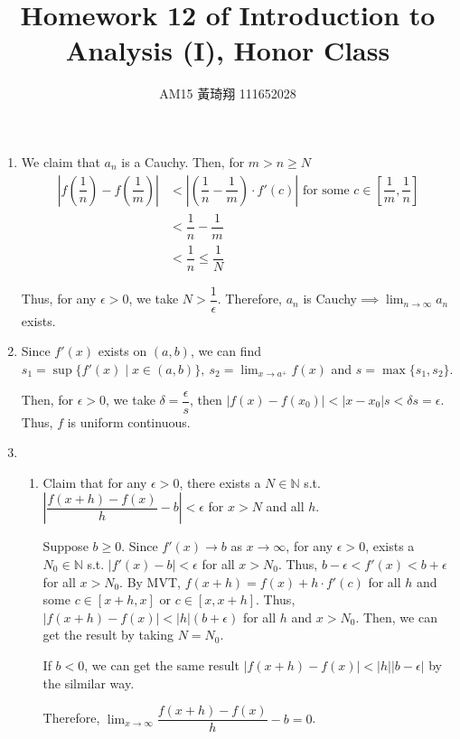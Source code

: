 \documentclass[12pt]{article}
\title{Homework 12 of Introduction to Analysis (I), Honor Class}
\author{AM15 黃琦翔 111652028}
\begin{document}
\maketitle
\begin{enumerate}
    \item We claim that $a_n$ is a Cauchy. 
    Then, for $m > n\geq N$
    \begin{align*}
        |f(\dfrac{1}{n}) - f(\dfrac{1}{m})| &< |(\dfrac{1}{n} - \dfrac{1}{m})\cdot f'(c)| \text{ for some } c\in [\dfrac{1}{m}, \dfrac{1}{n}]\\
        &< \dfrac{1}{n} - \dfrac{1}{m}\\
        &< \dfrac{1}{n} \leq \dfrac{1}{N}
    \end{align*}

    Thus, for any $\epsilon > 0$, we take $N > \dfrac{1}{\epsilon}$.
    Therefore, $a_n$ is Cauchy$\implies \displaystyle\lim_{n\to\infty} a_n$ exists.

    \item Since $f'(x)$ exists on $(a, b)$, we can find $s_1 = \sup\{f'(x) \mid x\in (a, b)\},\ s_2 = \displaystyle\lim_{x\to a^+} f(x)$ and $s = \max\{ s_1, s_2\}$.
    
    Then, for $\epsilon > 0$, we take $\delta = \dfrac{\epsilon}{s}$, then $|f(x) - f(x_0)| < |x - x_0| s < \delta s= \epsilon$.
    Thus, $f$ is uniform continuous.

    \item \begin{enumerate}
        \item Claim that for any $\epsilon > 0$, there exists a $N\in \mathbb{N}$ s.t. $|\dfrac{f(x+h) - f(x)}{h} - b| < \epsilon$ for $x > N$ and all $h$.

        Suppose $b \geq 0$.
        Since $f'(x) \to b$ as $x\to \infty$, for any $\epsilon > 0$, exists a $N_0\in \mathbb{N}$ s.t. $|f'(x) - b| < \epsilon$ for all $x > N_0$.
        Thus, $b - \epsilon < f'(x) < b + \epsilon$ for all $x > N_0$.
        By MVT, $f(x + h) = f(x) + h\cdot f'(c)$ for all $h$ and some $c \in [x + h, x]$ or $c\in [x, x+h]$.
        Thus, $|f(x + h) - f(x)| < |h|(b + \epsilon)$ for all $h$ and $x > N_0$.
        Then, we can get the result by taking $N = N_0$.

        If $b < 0$, we can get the same result $|f(x+h) - f(x)| < |h||b-\epsilon|$ by the silmilar way.

        Therefore, $\displaystyle\lim_{x\to\infty} \dfrac{f(x + h) - f(x)}{h} - b = 0$.


\end{enumerate}
\end{enumerate}
\end{document}
